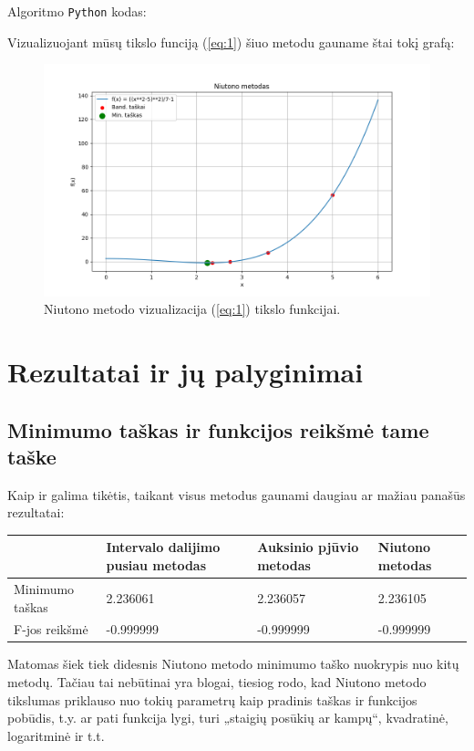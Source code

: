 \documentclass{article}
\begin{document}
Algoritmo \lstinline|Python| kodas:

Vizualizuojant mūsų tikslo funciją (\ref{eq:1}) šiuo metodu gauname štai tokį grafą:
\begin{figure}[H]
    \centering
    \includegraphics[width=1\textwidth]{Figure_3.png}
    \caption{Niutono metodo vizualizacija (\ref{eq:1}) tikslo funkcijai.}
    \label{fig:3}
\end{figure}
\section{Rezultatai ir jų palyginimai}
\subsection{Minimumo taškas ir funkcijos reikšmė tame taške}
Kaip ir galima tikėtis, taikant visus metodus gaunami daugiau ar mažiau panašūs rezultatai:
\begin{table}[H]
    \centering
    \begin{tabular}{|p{3cm}|p{3cm}|p{3cm}|p{3cm}|}
    \hline
    \multicolumn{1}{|l|}{} & Intervalo dalijimo pusiau metodas & Auksinio pjūvio metodas & Niutono metodas \\ \hline
                       Minimumo taškas    & 2.236061 & 2.236057 & 2.236105 \\ \hline
                       F-jos reikšmė   & -0.999999 & -0.999999 & -0.999999 \\ \hline
    \end{tabular}
\end{table}
Matomas šiek tiek didesnis Niutono metodo minimumo taško nuokrypis nuo kitų metodų. Tačiau tai nebūtinai yra blogai, tiesiog rodo, kad Niutono metodo tikslumas priklauso nuo tokių parametrų kaip pradinis taškas ir funkcijos pobūdis, t.y. ar pati funkcija lygi, turi „staigių posūkių ar kampų“, kvadratinė, logaritminė ir t.t.
\end{document}
